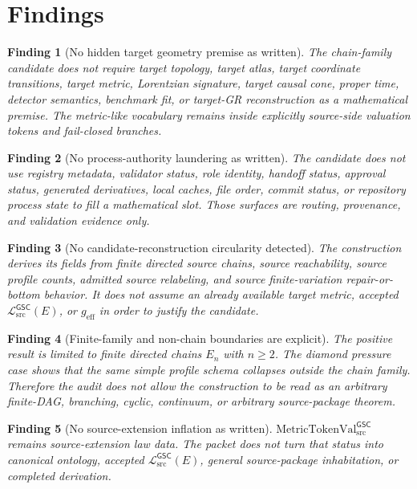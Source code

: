 \documentclass[11pt]{article}
\newcommand{\MetricTokenVal}{\mathrm{MetricTokenVal}_{\mathrm{src}}^{\mathsf{GSC}}}
\newcommand{\MetricData}{\mathcal{L}_{\mathrm{src}}^{\mathsf{GSC}}}
\newcommand{\geff}{g_{\mathrm{eff}}}
\newcommand{\En}{E_n}
\newtheorem{finding}{Finding}
\begin{document}
\section{Findings}

\begin{finding}[No hidden target geometry premise as written]
The chain-family candidate does not require target topology, target atlas,
target coordinate transitions, target metric, Lorentzian signature, target
causal cone, proper time, detector semantics, benchmark fit, or target-GR
reconstruction as a mathematical premise. The metric-like vocabulary remains
inside explicitly source-side valuation tokens and fail-closed branches.
\end{finding}

\begin{finding}[No process-authority laundering as written]
The candidate does not use registry metadata, validator status, role identity,
handoff status, approval status, generated derivatives, local caches, file
order, commit status, or repository process state to fill a mathematical
slot. Those surfaces are routing, provenance, and validation evidence only.
\end{finding}

\begin{finding}[No candidate-reconstruction circularity detected]
The construction derives its fields from finite directed source chains,
source reachability, source profile counts, admitted source relabeling, and
source finite-variation repair-or-bottom behavior. It does not assume an
already available target metric, accepted \(\MetricData(E)\), or \(\geff\)
in order to justify the candidate.
\end{finding}

\begin{finding}[Finite-family and non-chain boundaries are explicit]
The positive result is limited to finite directed chains \(\En\) with
\(n\ge 2\). The diamond pressure case shows that the same simple profile
schema collapses outside the chain family. Therefore the audit does not allow
the construction to be read as an arbitrary finite-DAG, branching, cyclic,
continuum, or arbitrary source-package theorem.
\end{finding}

\begin{finding}[No source-extension inflation as written]
\(\MetricTokenVal\) remains source-extension law data. The packet does not
turn that status into canonical ontology, accepted \(\MetricData(E)\),
general source-package inhabitation, or completed derivation.
\end{finding}
\end{document}
